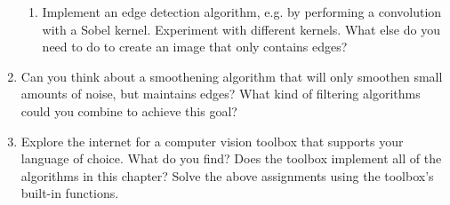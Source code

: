 \begin{enumerate}
\begin{enumerate}
\item Implement an edge detection algorithm, e.g. by performing a convolution with a Sobel kernel. Experiment with different kernels. What else do you need to do to create an image that only contains edges?
\end{enumerate}
\item Can you think about a smoothening algorithm that will only smoothen small amounts of noise, but maintains edges? What kind of filtering algorithms could you combine to achieve this goal?
\item Explore the internet for a computer vision toolbox that supports your language of choice. What do you find? Does the toolbox implement all of the algorithms in this chapter? Solve the above assignments using the toolbox's built-in functions.
\end{enumerate} \normalsize
